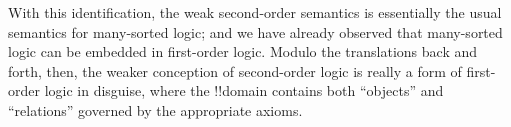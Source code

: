 \documentclass[../../include/open-logic-section]{subfiles}
\begin{document}
With this identification, the weak second-order semantics is essentially
the usual semantics for many-sorted logic; and we have already
observed that many-sorted logic can be embedded in first-order logic.
Modulo the translations back and forth, then, the weaker conception of
second-order logic is really a form of first-order logic in disguise,
where the !!{domain} contains both ``objects'' and ``relations''
governed by the appropriate axioms.
\end{document}
